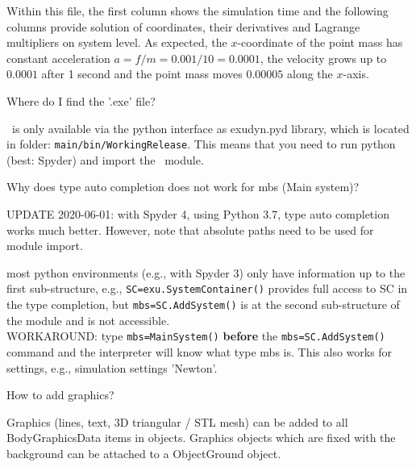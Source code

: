 Within this file, the first column shows the simulation time and the following columns provide solution of coordinates, their derivatives and Lagrange multipliers on system level. As expected, the $x$-coordinate of the point mass has constant acceleration $a=f/m=0.001/10=0.0001$, the velocity grows up to $0.0001$ after 1 second and the point mass moves $0.00005$ along the $x$-axis.
%

\bn
  \item Where do I find the '.exe' file?
	\bi
	\item[$\ra$] \codeName\ is only available via the python interface as exudyn.pyd library, which is located in folder: \texttt{main/bin/WorkingRelease}. This means that you need to run python (best: Spyder) and import the \codeName\ module.
	\ei
	\item Why does type auto completion does not work for mbs (Main system)?
	\bi
	\item[$\ra$] UPDATE 2020-06-01: with Spyder 4, using Python 3.7, type auto completion works much better. However, note that absolute paths need to be used for module import.
	\item[$\ra$] most python environments (e.g., with Spyder 3) only have information up to the first sub-structure, e.g., \texttt{SC=exu.SystemContainer()} provides full access to SC in the type completion, but \texttt{mbs=SC.AddSystem()} is at the second sub-structure of the module and is not accessible.\\
	WORKAROUND: type \texttt{mbs=MainSystem()} {\bf before} the \texttt{mbs=SC.AddSystem()} command and the interpreter will know what type mbs is. This also works for settings, e.g., simulation settings 'Newton'.
	\ei
  \item How to add graphics?
	\bi
	\item[$\ra$] Graphics (lines, text, 3D triangular / STL mesh) can be added to all BodyGraphicsData items in objects. Graphics objects which are fixed with the background can be attached to a ObjectGround object.
